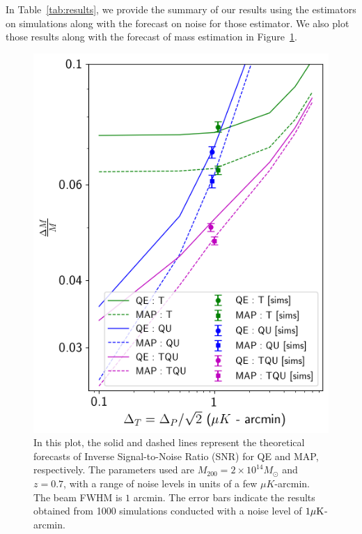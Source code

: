 \documentclass[prd, superscriptaddress, tightenlines, longbibliography, nofootinbib, eqsecnum, amsfonts, amsmath, floatfix, twocolumn, notitlepage]{revtex4-2}
\newcommand{\JC}[1]{\color{purple}{{JC:#1}}\color{black}\xspace}
\begin{document}
In Table~\ref{tab:results}, we provide the summary of our results using the estimators on simulations along with the forecast on noise for those estimator. We also plot those results along with the forecast of mass estimation in Figure~\ref{fig:forecast}.   
\begin{figure}[H]
    \centering
    \includegraphics[width=1.\hsize]{Figures/forcast_snr.png}
    \caption{In this plot, the solid and dashed lines represent the theoretical forecasts of Inverse Signal-to-Noise Ratio (SNR)\JC{ISNR ...?} for QE and MAP, respectively. The parameters used are $M_{200} = 2\times10^{14}M_{\odot}$ and $z=0.7$, with a range of noise levels in units of a few $\mu K$-arcmin. The beam FWHM is $1$ arcmin. The error bars indicate the results obtained from 1000 simulations conducted with a noise level of $1 \mu \rm{K}$-arcmin.}
    \label{fig:forecast}
\end{figure}
\end{document}
